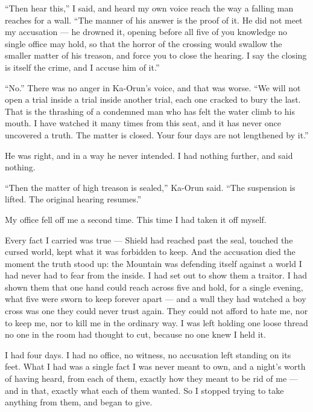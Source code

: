 ``Then hear this,'' I said, and heard my own voice reach the way a falling man reaches for a wall. ``The manner of his answer is the proof of it. He did not meet my accusation --- he drowned it, opening before all five of you knowledge no single office may hold, so that the horror of the crossing would swallow the smaller matter of his treason, and force you to close the hearing. I say the closing is itself the crime, and I accuse him of it.''\par

``No.'' There was no anger in Ka-Orun's voice, and that was worse. ``We will not open a trial inside a trial inside another trial, each one cracked to bury the last. That is the thrashing of a condemned man who has felt the water climb to his mouth. I have watched it many times from this seat, and it has never once uncovered a truth. The matter is closed. Your four days are not lengthened by it.''\par

He was right, and in a way he never intended. I had nothing further, and said nothing.\par

``Then the matter of high treason is sealed,'' Ka-Orun said. ``The suspension is lifted. The original hearing resumes.''\par
 
My office fell off me a second time. This time I had taken it off myself.\par
 
\ornament

Every fact I carried was true --- Shield had reached past the seal, touched the cursed world, kept what it was forbidden to keep. And the accusation died the moment the truth stood up: the Mountain was defending itself against a world I had never had to fear from the inside. I had set out to show them a traitor. I had shown them that one hand could reach across five and hold, for a single evening, what five were sworn to keep forever apart --- and a wall they had watched a boy cross was one they could never trust again. They could not afford to hate me, nor to keep me, nor to kill me in the ordinary way. I was left holding one loose thread no one in the room had thought to cut, because no one knew I held it.\par

\ornament

I had four days. I had no office, no witness, no accusation left standing on its feet. What I had was a single fact I was never meant to own, and a night's worth of having heard, from each of them, exactly how they meant to be rid of me --- and in that, exactly what each of them wanted. So I stopped trying to take anything from them, and began to give.\par

